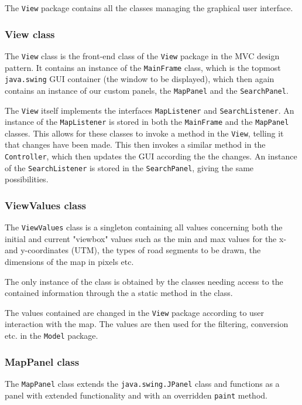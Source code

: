 The \texttt{View} package contains all the classes managing the graphical user interface.


\subsubsection{View class} %
The \texttt{View} class is the front-end class of the \texttt{View} package in the MVC design pattern. It contains an instance of the \texttt{MainFrame} class, which is the topmost \texttt{java.swing} GUI container (the window to be displayed), which then again contains an instance of our custom panels, the \texttt{MapPanel} and the \texttt{SearchPanel}.

The \texttt{View} itself implements the interfaces \texttt{MapListener} and \texttt{SearchListener}. An instance of the \texttt{MapListener} is stored in both the \texttt{MainFrame} and the \texttt{MapPanel} classes. This allows for these classes to invoke a method in the \texttt{View}, telling it that changes have been made. This then invokes a similar method in the \texttt{Controller}, which then updates the GUI according the the changes. An instance of the \texttt{SearchListener} is stored in the \texttt{SearchPanel}, giving the same possibilities.

\subsubsection{ViewValues class}
The \texttt{ViewValues} class is a singleton containing all values concerning both the initial and current "viewbox" values such as the min and max values for the x- and y-coordinates (UTM), the types of road segments to be drawn, the dimensions of the map in pixels etc.

The only instance of the class is obtained by the classes needing access to the contained information through the a static method in the class.

The values contained are changed in the \texttt{View} package according to user interaction with the map. The values are then used for the filtering, conversion etc. in the \texttt{Model} package.

\subsubsection{MapPanel class} %
The \texttt{MapPanel} class extends the \texttt{java.swing.JPanel} class and functions as a panel with extended functionality and with an overridden \texttt{paint} method.

